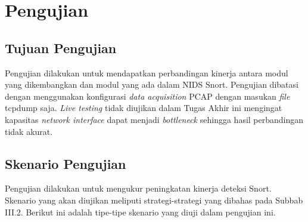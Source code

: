 


\section{Pengujian}

  \subsection{Tujuan Pengujian}
    Pengujian dilakukan untuk mendapatkan perbandingan kinerja antara modul yang dikembangkan dan modul yang ada dalam NIDS Snort. Pengujian dibatasi dengan menggunakan konfigurasi \emph{data acquisition} PCAP dengan masukan \emph{file} tcpdump saja. \emph{Live testing} tidak diujikan dalam Tugas Akhir ini mengingat kapasitas \emph{network interface} dapat menjadi \emph{bottleneck} sehingga hasil perbandingan tidak akurat.

  \subsection{Skenario Pengujian}
  
    Pengujian dilakukan untuk mengukur peningkatan kinerja deteksi Snort. Skenario yang akan diujikan meliputi strategi-strategi yang dibahas pada Subbab III.2. Berikut ini adalah tipe-tipe skenario yang diuji dalam pengujian ini.

